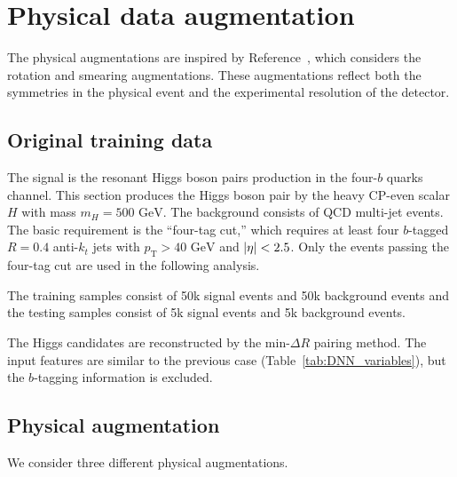 \documentclass[12pt]{article}
\begin{document}
\section{Physical data augmentation}%
\label{sec:physical_data_augmentation}
    The physical augmentations are inspired by Reference~\cite{Dillon:2023zac}, which considers the rotation and smearing augmentations. These augmentations reflect both the symmetries in the physical event and the experimental resolution of the detector.
    \subsection{Original training data}%
    \label{sub:original_training_data}
        The signal is the resonant Higgs boson pairs production in the four-$b$ quarks channel. This section produces the Higgs boson pair by the heavy CP-even scalar $H$ with mass $m_H = \text{500 GeV}$. The background consists of QCD multi-jet events. The basic requirement is the ``four-tag cut,'' which requires at least four $b$-tagged $R = 0.4$ anti-$k_t$ jets with $p_\text{T} > \text{40 GeV}$ and $\abs{\eta} < 2.5$. Only the events passing the four-tag cut are used in the following analysis.

        The training samples consist of 50k signal events and 50k background events and the testing samples consist of 5k signal events and 5k background events.

        The Higgs candidates are reconstructed by the $\text{min-}\Delta R$ pairing method. The input features are similar to the previous case (Table~\ref{tab:DNN_variables}), but the $b$-tagging information is excluded.
    \subsection{Physical augmentation}%
    \label{sub:physical_augmentation}
        We consider three different physical augmentations.
\end{document}
